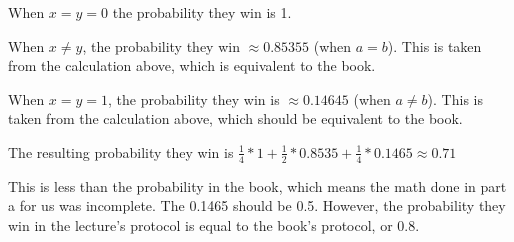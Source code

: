 \documentclass{article}
\begin{document}
\medskip
\noindent When $x=y=0$ the probability they win is 1.

\medskip
\noindent When $x\neq y$, the probability they win $\approx  0.85355$ (when $a = b$).  This is taken from the calculation above, which is equivalent to the book.

\medskip
\noindent When $x=y=1$, the probability they win is $\approx  0.14645$ (when $a\neq b$).  This is taken from the calculation above, which should be equivalent to the book.

\bigskip
The resulting probability they win is $\frac14*1 + \frac12*0.8535 + \frac 14 * 0.1465 \approx 0.71$

This is less than the probability in the book, which means the math done in part a for us was incomplete.  The 0.1465 should be 0.5.  However, the probability they win in the lecture's protocol is equal to the book's protocol, or 0.8.
\end{document}
